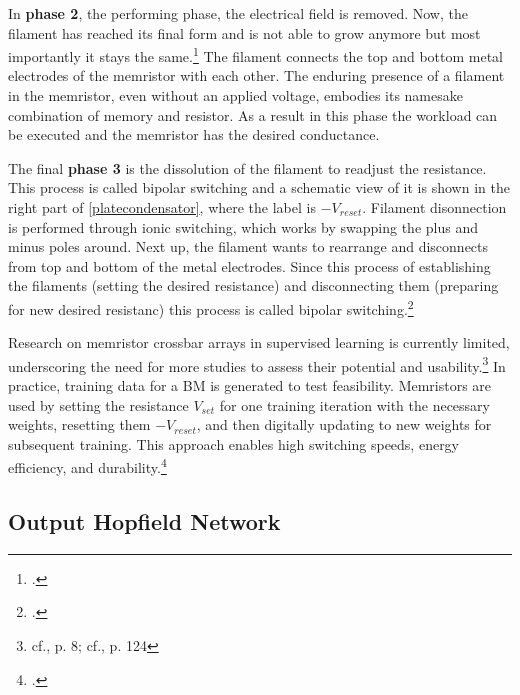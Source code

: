 In \textbf{phase 2}, the performing phase, the electrical field is removed.
Now, the filament has reached its final form and is not able to grow anymore but most importantly it stays the same.\footcite[cf.][1-2]{sungPerspectiveReviewMemristive2018}
The filament connects the top and bottom metal electrodes of the memristor with each other.
The enduring presence of a filament in the memristor, even without an applied voltage, embodies its namesake combination of memory and resistor.
As a result in this phase the workload can be executed and the memristor has the desired conductance.

The final \textbf{phase 3} is the dissolution of the filament to readjust the resistance.
This process is called bipolar switching and a schematic view of it is shown in the right part of \ref{platecondensator}, where the label is \(-V_{reset}\).
Filament disonnection is performed through ionic switching, which works by swapping the plus and minus poles around.
Next up, the filament wants to rearrange and disconnects from top and bottom of the metal electrodes. 
Since this process of establishing the filaments (setting the desired resistance) and disconnecting them (preparing for new desired resistanc) this process is called bipolar switching.\footcite[cf.][7]{sungPerspectiveReviewMemristive2018}

Research on memristor crossbar arrays in supervised learning is currently limited, underscoring the need for more studies to assess their potential and usability.\footnote{cf.\cite{amirsoleimaniInMemoryVectorMatrixMultiplication2020}, p. 8; cf.\cite{sungPerspectiveReviewMemristive2018}, p. 124}
In practice, training data for a \ac{BM} is generated to test feasibility.
Memristors are used by setting the resistance \(V_{set}\) for one training iteration with the necessary weights, resetting them \(-V_{reset}\), and then digitally updating to new weights for subsequent training.
This approach enables high switching speeds, energy efficiency, and durability.\footcite[cf.][3]{amirsoleimaniInMemoryVectorMatrixMultiplication2020}

\subsection{Output Hopfield Network}

